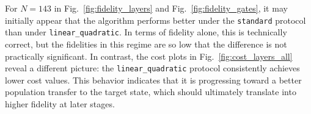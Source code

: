 For $N=143$ in Fig.~\ref{fig:fidelity_layers} and Fig.~\ref{fig:fidelity_gates}, it may initially appear that the algorithm performs better under the \texttt{standard} protocol than under \texttt{linear\_quadratic}. In terms of fidelity alone, this is technically correct, but the fidelities in this regime are so low that the difference is not practically significant. In contrast, the cost plots in Fig.~\ref{fig:cost_layers_all} reveal a different picture: the \texttt{linear\_quadratic} protocol consistently achieves lower cost values. This behavior indicates that it is progressing toward a better population transfer to the target state, which should ultimately translate into higher fidelity at later stages.



